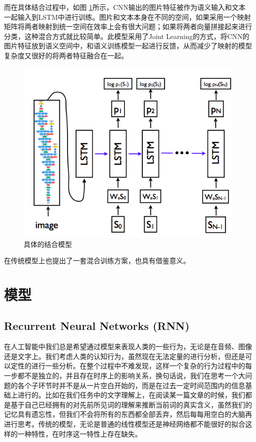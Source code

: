 \documentclass[10pt, titlepage]{article}
\begin{document}
		而在具体结合过程中，如图 \ref{fig:multisample2}所示，CNN输出的图片特征被作为语义输入和文本一起输入到LSTM中进行训练。图片和文本本身在不同的空间，如果采用一个映射矩阵将两者映射到统一空间在效率上会有很大问题；如果将两者向量拼接起来进行分类，这种混合方式就比较简单。此模型采用了Joint Learning的方式，将CNN的图片特征放到语义空间中，和语义训练模型一起进行反馈，从而减少了映射的模型复杂度又很好的将两者特征融合在一起。
			
			\begin{figure}[htb]
			\centering
			\includegraphics[width=0.6\columnwidth]{figs/9.png}
			\caption{具体的结合模型}
			\label{fig:multisample2}
			\end{figure}

		\cite{you2016cross}在传统模型上也提出了一套混合训练方案，也具有借鉴意义。

\section{模型}


\subsection{Recurrent Neural Networks (RNN)}

在人工智能中我们总是希望通过模型来表现人类的一些行为，无论是在音频、图像还是文字上。我们考虑人类的认知行为，虽然现在无法定量的进行分析，但还是可以定性的进行一些分析。在整个过程中不难发现，这样一个复杂的行为过程中的每一步都不是独立的，并且存在时序上的影响关系，换句话说，我们在思考一个大问题的各个子环节时并不是从一片空白开始的，而是在过去一定时间范围内的信息基础上进行的。比如在我们任务中的文字理解上，在阅读某一篇文章的时候，我们都是基于自己已经拥有的对先前所见词的理解来推断当前词的真实含义，虽然我们的记忆具有遗忘性，但我们不会将所有的东西都全部丢弃，然后每每用空白的大脑再进行思考。传统的模型，无论是普通的线性模型还是神经网络都不能很好的拟合这样的一种特性，在时序这一特性上存在缺失。
\end{document}
